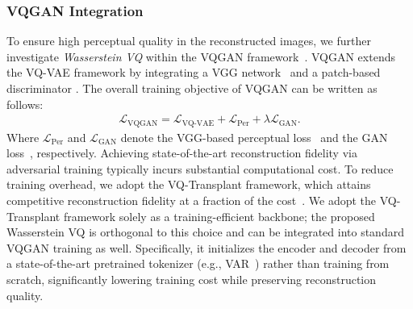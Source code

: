 \vspace{2ex}
\subsubsection{VQGAN Integration}
\label{sec:VQGAN}
To ensure high perceptual quality in the reconstructed images, we further investigate \emph{Wasserstein VQ} within the VQGAN framework~\cite{Esser2020TamingTF}. VQGAN extends the VQ-VAE framework by integrating a VGG network~\cite{Simonyan2014VeryDC}  and a patch-based discriminator \cite{Esser2020TamingTF, Johnson2016PerceptualLF}. The overall training objective of VQGAN can be written as follows:
\begin{align}
\label{eq:vqgan}
\mathcal{L}_{\text{VQGAN}} = \mathcal{L}_{\text{VQ-VAE}} + \mathcal{L}_{\text{Per}} + \lambda \mathcal{L}_{\text{GAN}}.
\end{align}
Where $\mathcal{L}_{\text{Per}}$ and $\mathcal{L}_{\text{GAN}}$ denote the VGG-based perceptual loss~\cite{Zhang2018TheUE} and the GAN loss~\cite{Isola2016ImagetoImageTW, Lim2017GeometricG}, respectively. Achieving state-of-the-art reconstruction fidelity via adversarial training typically incurs substantial computational cost. 
To reduce training overhead, we adopt the VQ-Transplant framework, which attains competitive reconstruction fidelity at a fraction of the cost~\cite{Fang2025VQTransplant}. 
We adopt the VQ-Transplant framework solely as a training-efficient backbone; the proposed Wasserstein VQ is orthogonal to this choice and can be integrated into standard VQGAN training as well.
Specifically, it initializes the encoder and decoder from a state-of-the-art pretrained tokenizer (e.g., VAR~\cite{Tian2024VisualAM}) rather than training from scratch, significantly lowering training cost while preserving reconstruction quality.




